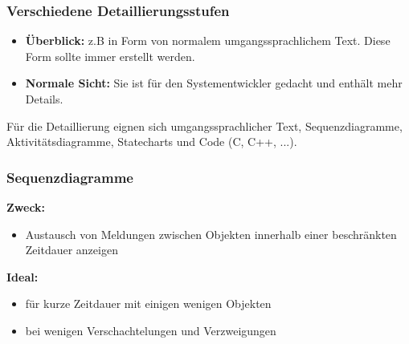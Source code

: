 \subsubsection{Verschiedene Detaillierungsstufen}
\begin{itemize}
	\item \textbf{Überblick: } z.B in Form von normalem umgangssprachlichem Text. Diese Form sollte immer erstellt werden.
	\item \textbf{Normale Sicht: } Sie ist für den Systementwickler gedacht und enthält mehr Details.
\end{itemize}

Für die Detaillierung eignen sich umgangssprachlicher Text, Sequenzdiagramme, Aktivitätsdiagramme, Statecharts und Code (C, C++, ...).

\subsubsection{Sequenzdiagramme}

\begin{multicols}{2}
	\textbf{Zweck:}
	\begin{itemize}
		\item Austausch von Meldungen zwischen Objekten innerhalb einer beschränkten Zeitdauer anzeigen
	\end{itemize}
	\vfill\null
	\columnbreak
	\textbf{Ideal:}
	\begin{itemize}
		\item für kurze Zeitdauer mit einigen wenigen Objekten
		\item bei wenigen Verschachtelungen und Verzweigungen
	\end{itemize}
\end{multicols}

